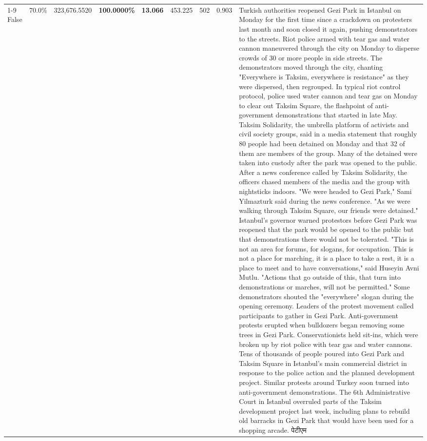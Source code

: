 \begin{table}[H]
\begin{tabular}{lllrlllll}
\cline{1-9}
False & 70.0\% & 323,676.5520 & \bfseries \color{red} 100.0000\% & \bfseries \color{red} 13.066 & 453.225 & 502 & 0.903 & Turkish authorities reopened Gezi Park in Istanbul on Monday for the first time since a crackdown on protesters last month and soon closed it again, pushing demonstrators to the streets. Riot police armed with tear gas and water cannon maneuvered through the city on Monday to disperse crowds of 30 or more people in side streets. The demonstrators moved through the city, chanting "Everywhere is Taksim, everywhere is resistance" as they were dispersed, then regrouped. In typical riot control protocol, police used water cannon and tear gas on Monday to clear out Taksim Square, the flashpoint of anti-government demonstrations that started in late May. Taksim Solidarity, the umbrella platform of activists and civil society groups, said in a media statement that roughly 80 people had been detained on Monday and that 32 of them are members of the group. Many of the detained were taken into custody after the park was opened to the public. After a news conference called by Taksim Solidarity, the officers chased members of the media and the group with nightsticks indoors. "We were headed to Gezi Park," Sami Yilmazturk said during the news conference. "As we were walking through Taksim Square, our friends were detained." Istanbul's governor warned protestors before Gezi Park was reopened that the park would be opened to the public but that demonstrations there would not be tolerated. "This is not an area for forums, for slogans, for occupation. This is not a place for marching, it is a place to take a rest, it is a place to meet and to have conversations," said Huseyin Avni Mutlu. "Actions that go outside of this, that turn into demonstrations or marches, will not be permitted." Some demonstrators shouted the "everywhere" slogan during the opening ceremony. Leaders of the protest movement called participants to gather in Gezi Park. Anti-government protests erupted when bulldozers began removing some trees in Gezi Park. Conservationists held sit-ins, which were broken up by riot police with tear gas and water cannons. Tens of thousands of people poured into Gezi Park and Taksim Square in Istanbul's main commercial district in response to the police action and the planned development project. Similar protests around Turkey soon turned into anti-government demonstrations. The 6th Administrative Court in Istanbul overruled parts of the Taksim development project last week, including plans to rebuild old barracks in Gezi Park that would have been used for a shopping arcade. पेटीएम \\

\end{tabular}
\end{table}
